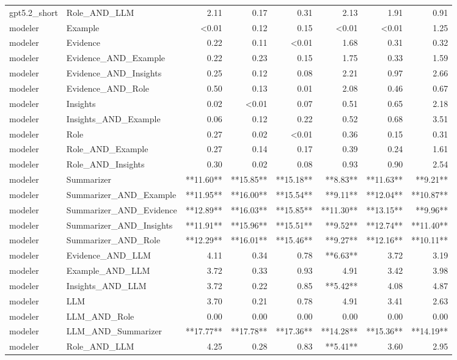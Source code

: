 \begin{tabular}{llrrrrrr}
gpt5.2_short & Role_AND_LLM & 2.11 & 0.17 & 0.31 & 2.13 & 1.91 & 0.91 \\
modeler & Example & <0.01 & 0.12 & 0.15 & <0.01 & <0.01 & 1.25 \\
modeler & Evidence & 0.22 & 0.11 & <0.01 & 1.68 & 0.31 & 0.32 \\
modeler & Evidence_AND_Example & 0.22 & 0.23 & 0.15 & 1.75 & 0.33 & 1.59 \\
modeler & Evidence_AND_Insights & 0.25 & 0.12 & 0.08 & 2.21 & 0.97 & 2.66 \\
modeler & Evidence_AND_Role & 0.50 & 0.13 & 0.01 & 2.08 & 0.46 & 0.67 \\
modeler & Insights & 0.02 & <0.01 & 0.07 & 0.51 & 0.65 & 2.18 \\
modeler & Insights_AND_Example & 0.06 & 0.12 & 0.22 & 0.52 & 0.68 & 3.51 \\
modeler & Role & 0.27 & 0.02 & <0.01 & 0.36 & 0.15 & 0.31 \\
modeler & Role_AND_Example & 0.27 & 0.14 & 0.17 & 0.39 & 0.24 & 1.61 \\
modeler & Role_AND_Insights & 0.30 & 0.02 & 0.08 & 0.93 & 0.90 & 2.54 \\
modeler & Summarizer & **11.60** & **15.85** & **15.18** & **8.83** & **11.63** & **9.21** \\
modeler & Summarizer_AND_Example & **11.95** & **16.00** & **15.54** & **9.11** & **12.04** & **10.87** \\
modeler & Summarizer_AND_Evidence & **12.89** & **16.03** & **15.85** & **11.30** & **13.15** & **9.96** \\
modeler & Summarizer_AND_Insights & **11.91** & **15.96** & **15.51** & **9.52** & **12.74** & **11.40** \\
modeler & Summarizer_AND_Role & **12.29** & **16.01** & **15.46** & **9.27** & **12.16** & **10.11** \\
modeler & Evidence_AND_LLM & 4.11 & 0.34 & 0.78 & **6.63** & 3.72 & 3.19 \\
modeler & Example_AND_LLM & 3.72 & 0.33 & 0.93 & 4.91 & 3.42 & 3.98 \\
modeler & Insights_AND_LLM & 3.72 & 0.22 & 0.85 & **5.42** & 4.08 & 4.87 \\
modeler & LLM & 3.70 & 0.21 & 0.78 & 4.91 & 3.41 & 2.63 \\
modeler & LLM_AND_Role & 0.00 & 0.00 & 0.00 & 0.00 & 0.00 & 0.00 \\
modeler & LLM_AND_Summarizer & **17.77** & **17.78** & **17.36** & **14.28** & **15.36** & **14.19** \\
modeler & Role_AND_LLM & 4.25 & 0.28 & 0.83 & **5.41** & 3.60 & 2.95 \\
\bottomrule
\end{tabular}

